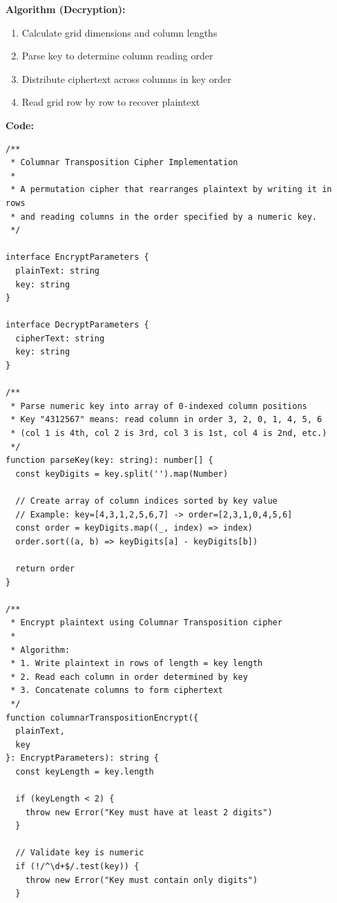 \documentclass[12pt,a4paper]{article}
\begin{document}
\textbf{Algorithm (Decryption):}
\begin{enumerate}
    \item Calculate grid dimensions and column lengths
    \item Parse key to determine column reading order
    \item Distribute ciphertext across columns in key order
    \item Read grid row by row to recover plaintext
\end{enumerate}

\vspace{0.5cm}

\noindent \large \textbf{Code:} \\
\normalsize

\begin{verbatim}
/**
 * Columnar Transposition Cipher Implementation
 *
 * A permutation cipher that rearranges plaintext by writing it in rows
 * and reading columns in the order specified by a numeric key.
 */

interface EncryptParameters {
  plainText: string
  key: string
}

interface DecryptParameters {
  cipherText: string
  key: string
}

/**
 * Parse numeric key into array of 0-indexed column positions
 * Key "4312567" means: read column in order 3, 2, 0, 1, 4, 5, 6
 * (col 1 is 4th, col 2 is 3rd, col 3 is 1st, col 4 is 2nd, etc.)
 */
function parseKey(key: string): number[] {
  const keyDigits = key.split('').map(Number)

  // Create array of column indices sorted by key value
  // Example: key=[4,3,1,2,5,6,7] -> order=[2,3,1,0,4,5,6]
  const order = keyDigits.map((_, index) => index)
  order.sort((a, b) => keyDigits[a] - keyDigits[b])

  return order
}

/**
 * Encrypt plaintext using Columnar Transposition cipher
 *
 * Algorithm:
 * 1. Write plaintext in rows of length = key length
 * 2. Read each column in order determined by key
 * 3. Concatenate columns to form ciphertext
 */
function columnarTranspositionEncrypt({
  plainText,
  key
}: EncryptParameters): string {
  const keyLength = key.length

  if (keyLength < 2) {
    throw new Error("Key must have at least 2 digits")
  }

  // Validate key is numeric
  if (!/^\d+$/.test(key)) {
    throw new Error("Key must contain only digits")
  }


\end{verbatim}
\end{document}
